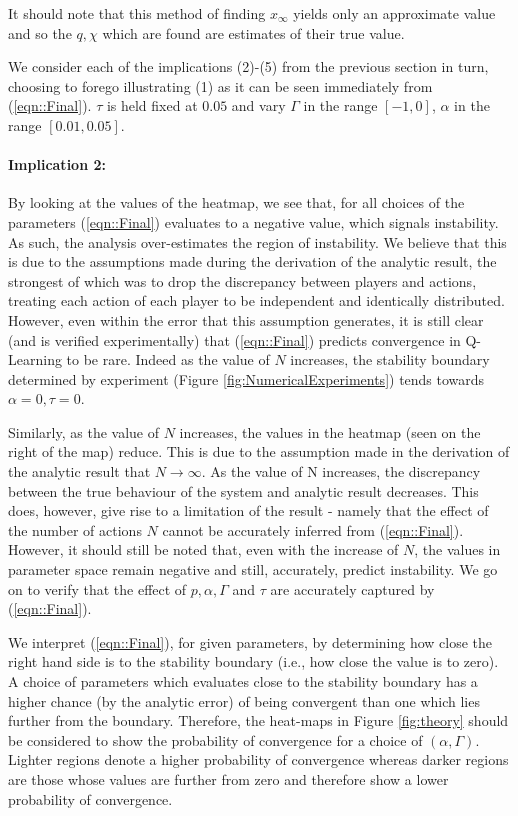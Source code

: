 \documentclass[sigconf,anonymous]{aamas}
\newcommand{\xfixed}{x_\infty}
\begin{document}
It should note that this method of finding $\xfixed$ yields only an approximate value and so the $q, \chi$ which are found are estimates of their true value. 

We consider each of the implications (2)-(5) from the previous section
in turn, choosing to forego illustrating (1) as it can be seen immediately
from (\ref{eqn::Final}). $\tau$ is held fixed
at $0.05$ and vary $\Gamma$ in
the range $[-1, 0]$, $\alpha$ in the range $[0.01, 0.05]$.

\paragraph{Implication 2:} By looking at the values of the heatmap, we see that, for all choices
of the parameters
(\ref{eqn::Final}) evaluates to a negative value, which signals
instability. As such, the analysis over-estimates the region of
instability. We believe that this is due to the
assumptions made during the derivation of the analytic result, the
strongest of which was to drop the discrepancy between players and
actions, treating each action of each player to be independent and
identically distributed. However, even within the error that this
assumption generates, it is still clear (and is verified
experimentally) that (\ref{eqn::Final}) predicts convergence in Q-Learning to be rare. Indeed as the
value of $N$ increases, the stability boundary determined by
experiment (Figure \ref{fig:NumericalExperiments}) tends towards
$\alpha = 0, \tau = 0$.

Similarly, as the value of $N$ increases, the values in the heatmap
(seen on the right of the map) reduce. This is due to the assumption
made in the derivation of the analytic result that $N \rightarrow
\infty$. As the value of N increases, the discrepancy between the true
behaviour of the system and analytic result decreases. This does,
however, give rise to a limitation of the result - namely that the
effect of the number of actions $N$ cannot be accurately inferred from
 (\ref{eqn::Final}). However, it should still be noted that, even
with the increase of $N$, the values in parameter space remain negative
and still, accurately, predict instability. We go on to verify that
the effect of $p, \alpha, \Gamma$ and $\tau$ are accurately captured
by (\ref{eqn::Final}).

We interpret (\ref{eqn::Final}), for given parameters, by determining how close the right hand side is to the stability boundary (i.e., how close the value is to zero). A choice of parameters which evaluates close to the stability boundary has a higher chance (by the analytic error) of being convergent than one which lies further from the boundary. Therefore, the heat-maps in Figure \ref{fig:theory} should be considered to show the probability of convergence for a choice of $(\alpha, \Gamma)$. Lighter regions denote a higher probability of convergence whereas darker regions are those whose values are further from zero and therefore show a lower probability of convergence.
\end{document}
